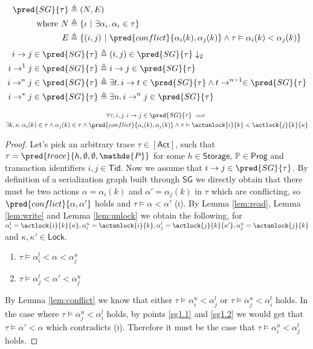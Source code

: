 \begin{align*}
\pred{SG}{\tau} &\triangleq (N, E) \\
\text{where } N &\triangleq \{ \iota\ |\ \exists \alpha_\iota \ldotp \alpha_\iota \in \tau \} \\
E &\triangleq \{ (i, j)\ |\ \pred{conflict}{\alpha_i(k), \alpha_j(k)} \land \tau \vDash \alpha_i(k) < \alpha_j(k) \}
\end{align*}
\begin{align*}
i \rightarrow j \in \pred{SG}{\tau} &\triangleq (i, j) \in \pred{SG}{\tau} \downarrow_2
\\
i \rightarrow^1 j \in \pred{SG}{\tau} &\triangleq i \rightarrow j \in \pred{SG}{\tau}
\\
i \rightarrow^n j \in \pred{SG}{\tau} &\triangleq \exists t \ldotp i \rightarrow t \in \pred{SG}{\tau} \land t \rightarrow^{n-1} \in \pred{SG}{\tau}
\\
i \rightarrow^* j \in \pred{SG}{\tau} &\triangleq \exists n \ldotp i \rightarrow^n j \in \pred{SG}{\tau}
\end{align*}

\lem \label{lem:sg1}
\begin{gather*}
\forall \tau, i, j \ldotp i \rightarrow j \in \pred{SG}{\tau} \implies \\
\exists k, \kappa \ldotp \alpha_i(k) \in \tau \land \alpha_j(k) \in \tau \land \pred{conflict}{\alpha_i(k), \alpha_j(k)} \land \tau \vDash \actunlock{i}{k} < \actlock{j}{k}{\kappa}
\end{gather*}
\begin{proof}
Let's pick an arbitrary trace $\tau \in \mathsf{[Act]}$, such that $\tau = \pred{trace}{h, \emptyset, \emptyset, \mathds{P}}$ for some $h \in \mathsf{Storage}$, $\mathds{P} \in \mathsf{Prog}$ and transaction identifiers $i, j \in \mathsf{Tid}$. Now we assume that $i \rightarrow j \in \pred{SG}{\tau}$. By definition of a serialization graph built through $\mathsf{SG}$ we directly obtain that there must be two actions $\alpha = \alpha_i(k)$ and $\alpha' = \alpha_j(k)$ in $\tau$ which are conflicting, so $\pred{conflict}{\alpha, \alpha'}$ holds and $\tau \vDash \alpha < \alpha'$ (\textsc{i}). By Lemma \ref{lem:read}, Lemma \ref{lem:write} and Lemma \ref{lem:unlock} we obtain the following, for $\alpha_i^l = \actlock{i}{k}{\kappa}, \alpha_i^u = \actunlock{i}{k}, \alpha_j^l = \actlock{j}{k}{\kappa'}, \alpha_j^u = \actunlock{j}{k}$ and $\kappa, \kappa' \in \mathsf{Lock}$.
\begin{enumerate}
\item \label{sg1.1} $\tau \vDash \alpha_i^l < \alpha < \alpha_j^u$
\item \label{sg1.2} $\tau \vDash \alpha_j^l < \alpha' < \alpha_j^u$
\end{enumerate}
By Lemma \ref{lem:conflict} we know that either $\tau \vDash \alpha_i^u < \alpha_j^l$ or $\tau \vDash \alpha_j^u < \alpha_i^l$ holds. In the case where $\tau \vDash \alpha_j^u < \alpha_i^l$ holds, by points \ref{sg1.1} and \ref{sg1.2} we would get that $\tau \vDash \alpha' < \alpha$ which contradicts (\textsc{i}). Therefore it must be the case that $\tau \vDash \alpha_i^u < \alpha_j^l$ holds.
\end{proof}

